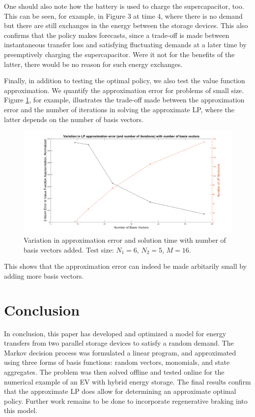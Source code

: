 \documentclass[conference]{IEEEtran}
\begin{document}
One should also note how the battery is used to charge the supercapacitor, too. This can be seen, for example, in Figure 3 at time 4, where there is no demand but there are still exchanges in the energy between the storage devices. This also confirms that the policy makes forecasts, since a trade-off is made between instantaneous transfer loss and satisfying fluctuating demands at a later time by preemptively charging the supercapacitor. Were it not for the benefits of the latter, there would be no reason for such energy exchanges.

Finally, in addition to testing the optimal policy, we also test the value function approximation. We quantify the approximation error for problems of small size. Figure \ref{fig:ApproxVsIter}, for example, illustrates the trade-off made between the approximation error and the number of iterations in solving the approximate LP, where the latter depends on the number of basis vectors. \begin{figure}[htbp]
\centerline{\includegraphics[scale=0.25]{ApproxErr_vs_NumIter.png}}
\caption{Variation in approximation error and solution time with number of basis vectors added. Test size: $N_{1}=6$, $N_{2}=5$, $M=16$.}
\label{fig:ApproxVsIter}
\end{figure} This shows that the approximation error can indeed be made arbitarily small by adding more basis vectors.



\section{Conclusion}
In conclusion, this paper has developed and optimized a model for energy transfers from two parallel storage devices to satisfy a random demand. The Markov decision process was formulated a linear program, and approximated using three forms of basis functions: random vectors, monomials, and state aggregates. The problem was then solved offline and tested online for the numerical example of an EV with hybrid energy storage. The final results confirm that the approximate LP does allow for determining an approximate optimal policy. Further work remains to be done to incorporate regenerative braking into this model.

\printbibliography
\end{document}
